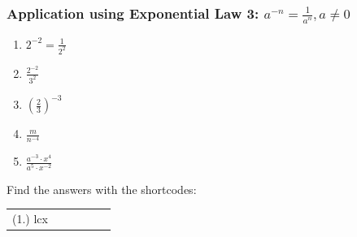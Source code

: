             \subsubsection{  Application using Exponential Law 3: ${a}^{-n}=\frac{1}{{a}^{n}},a\ne 0$ }
            \nopagebreak
        \label{m38359*id64771}\begin{enumerate}[noitemsep, label=\textbf{\arabic*}. ] 
            \label{m38359*uid18}\item 
            ${2}^{-2}=\frac{1}{{2}^{2}}$
      \label{m38359*uid19}\item 
        $\frac{{2}^{-2}}{{3}^{2}}$
      \label{m38359*uid20}\item 
        ${\left(\frac{2}{3}\right)}^{-3}$
      \label{m38359*uid21}\item 
        $\frac{m}{{n}^{-4}}$
      \label{m38359*uid22}\item 
        $\frac{{a}^{-3}\ensuremath{\cdot}{x}^{4}}{{a}^{5}\ensuremath{\cdot}{x}^{-2}}$
\newline
\newline
          \end{enumerate}
      \label{m38359*uid23}
\par {} Find the answers with the shortcodes:
 \par \begin{tabular}[h]{cccccc}
 (1.) lcx  & \end{tabular}
